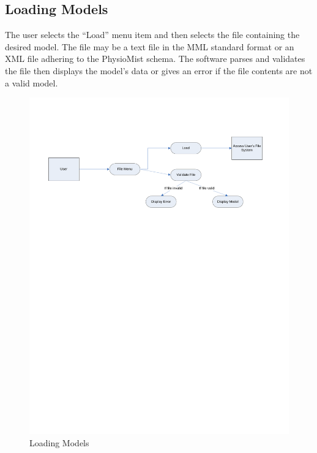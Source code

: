 \documentclass{article}
\begin{document}
\subsection{Loading Models}
The user selects the ``Load'' menu item and then selects the file containing the desired model. The file may be a text file in the MML standard format or an XML file adhering to the PhysioMist schema. The software parses and validates the file then displays the model's data or gives an error if the file contents are not a valid model.
\begin{figure}[!htb]
\centering
\includegraphics[width=\textwidth]{./diagrams/load}
\caption{Loading Models}
\end{figure}
\end{document}
